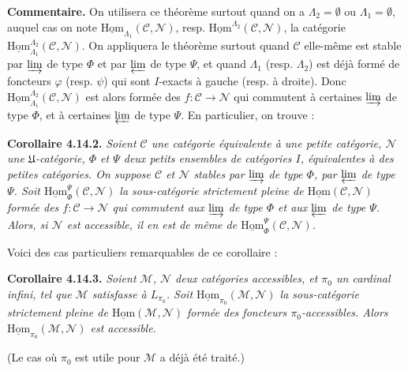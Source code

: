 \documentclass[11pt]{article}
\newcommand{\msp}[1]{\marginpar{\footnotesize [#1]}}
\newcommand{\uHom}{\underline{\mathrm{Hom}}}
\begin{document}
\noindent\textbf{Commentaire.} On utilisera ce théorème surtout quand on a $\Lambda_2=\emptyset$ ou $\Lambda_1=\emptyset$, auquel cas on note $\uHom_{\Lambda_1}(\mathcal{C},\mathcal{N})$, resp. $\uHom^{\Lambda_2}(\mathcal{C},\mathcal{N})$, la catégorie $\uHom^{\Lambda_2}_{\Lambda_1}(\mathcal{C},\mathcal{N})$. On appliquera le théorème surtout quand $\mathcal{C}$ elle-même est stable par $\varinjlim$ de type $\Phi$ et par $\varprojlim$ de type $\Psi$, et quand $\Lambda_1$ (resp. $\Lambda_2$) est déjà formé de foncteurs $\varphi$ (resp. $\psi$) qui sont $I$-exacts à gauche (resp. à droite). Donc $\uHom^{\Lambda_2}_{\Lambda_1}(\mathcal{C},\mathcal{N})$ est alors formée des $f:\mathcal{C}\longrightarrow\mathcal{N}$ qui commutent à certaines $\varinjlim$ de type $\Phi$, et à certaines $\varprojlim$ de type $\Psi$. En particulier, on trouve :

\msp{page 372}

\noindent\textbf{Corollaire 4.14.2.} {\itshape Soient $\mathcal{C}$ une catégorie équivalente à une petite catégorie, $\mathcal{N}$ une $\mathfrak{U}$-catégorie, $\Phi$ et $\Psi$ deux petits ensembles de catégories $I$, équivalentes à des petites catégories. On suppose $\mathcal{C}$ et $\mathcal{N}$ stables par $\varinjlim$ de type $\Phi$, par $\varprojlim$ de type $\Psi$. Soit $\uHom^{\Psi}_{\Phi}(\mathcal{C},\mathcal{N})$ la sous-catégorie strictement pleine de $\uHom(\mathcal{C},\mathcal{N})$ formée des $f:\mathcal{C}\longrightarrow\mathcal{N}$ qui commutent aux $\varinjlim$ de type $\Phi$ et aux $\varprojlim$ de type $\Psi$. Alors, si $\mathcal{N}$ est accessible, il en est de même de $\uHom^{\Psi}_{\Phi}(\mathcal{C},\mathcal{N})$.}

Voici des cas particuliers remarquables de ce corollaire :

\noindent\textbf{Corollaire 4.14.3.} {\itshape Soient $\mathcal{M}$, $\mathcal{N}$ deux catégories accessibles, et $\pi_0$ un cardinal infini, tel que $\mathcal{M}$ satisfasse à $L_{\pi_0}$. Soit $\uHom_{\pi_0}(\mathcal{M},\mathcal{N})$ la sous-catégorie strictement pleine de $\uHom(\mathcal{M},\mathcal{N})$ formée des foncteurs $\pi_0$-accessibles. Alors $\uHom_{\pi_0}(\mathcal{M},\mathcal{N})$ est accessible.}

\msp{page 373}

(Le cas où $\pi_0$ est utile pour $\mathcal{M}$ a déjà été traité.)
\end{document}
